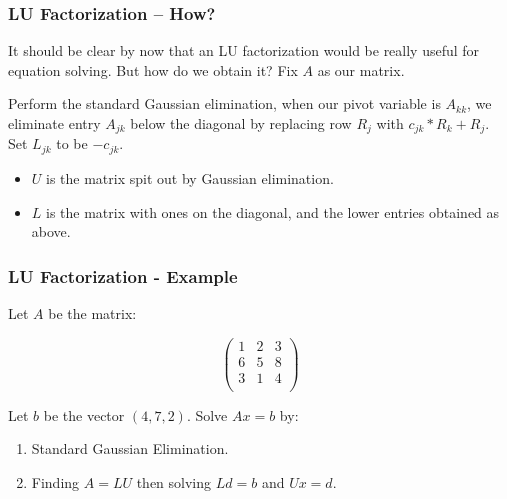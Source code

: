 \documentclass[12pt]{beamer}
\theoremstyle{definition}
\begin{document}
\begin{frame}
\frametitle{LU Factorization -- How?}
It should be clear by now that an LU factorization
would be really useful for equation solving. But how
do we obtain it? Fix $A$ as our matrix.

Perform the standard Gaussian elimination, when our pivot 
variable is $A_{kk}$, we eliminate
entry $A_{jk}$ below the diagonal by replacing row $R_j$ with $c_{jk}*R_k + R_j$.
Set $L_{jk}$ to be $-c_{jk}$.

\begin{itemize}
\item $U$ is the matrix spit out by Gaussian elimination.
\item $L$ is the matrix with ones on the diagonal, and the lower entries
obtained as above.
\end{itemize}
\end{frame}

\begin{frame}
\frametitle{LU Factorization - Example}

Let $A$ be the matrix:

\[
\left(\begin{array}{ccc}
1 & 2 & 3  \\
6 & 5 & 8  \\
3 & 1 & 4  \\
\end{array}\right)\]

Let $b$ be the vector $(4,7,2)$. Solve $Ax = b$ by:
\begin{enumerate}
\item Standard Gaussian Elimination.
\item Finding $A = LU$ then solving $Ld = b$ and $Ux = d$.
\end{enumerate}
\end{frame}
\end{document}
